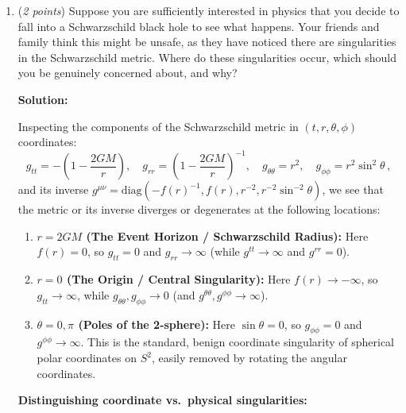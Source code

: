 \documentclass[12pt]{article}
\newcommand{\be}{\begin{equation}}
\newcommand{\ee}{\end{equation}}
\begin{document}
\begin{enumerate}[label=\alph*)]
\item  (\emph{2 points}) Suppose you are sufficiently interested in physics that you decide to fall into a Schwarzschild black hole to see what happens. Your friends and family think this might be unsafe, as they have noticed there are singularities in the Schwarzschild metric. Where do these singularities occur, which should you be genuinely concerned about, and why? 

\medskip
\noindent\textbf{Solution:}

Inspecting the components of the Schwarzschild metric in $(t,r,\theta,\phi)$ coordinates:
\be
g_{tt} = -\left(1 - \frac{2GM}{r}\right), \quad g_{rr} = \left(1 - \frac{2GM}{r}\right)^{-1}, \quad g_{\theta\theta} = r^2, \quad g_{\phi\phi} = r^2\sin^2\theta \,,
\ee
and its inverse $g^{\mu\nu} = \mathrm{diag}(-f(r)^{-1}, f(r), r^{-2}, r^{-2}\sin^{-2}\theta)$, we see that the metric or its inverse diverges or degenerates at the following locations:
\begin{enumerate}[label=\arabic*.]
\item \textbf{$r = 2GM$ (The Event Horizon / Schwarzschild Radius):} Here $f(r) = 0$, so $g_{tt} = 0$ and $g_{rr} \to \infty$ (while $g^{tt} \to \infty$ and $g^{rr} = 0$).
\item \textbf{$r = 0$ (The Origin / Central Singularity):} Here $f(r) \to -\infty$, so $g_{tt} \to \infty$, while $g_{\theta\theta}, g_{\phi\phi} \to 0$ (and $g^{\theta\theta}, g^{\phi\phi} \to \infty$).
\item \textbf{$\theta = 0, \pi$ (Poles of the 2-sphere):} Here $\sin\theta = 0$, so $g_{\phi\phi} = 0$ and $g^{\phi\phi} \to \infty$. This is the standard, benign coordinate singularity of spherical polar coordinates on $S^2$, easily removed by rotating the angular coordinates.
\end{enumerate}

\noindent\textbf{Distinguishing coordinate vs.\ physical singularities:}


\end{enumerate}
\end{document}

